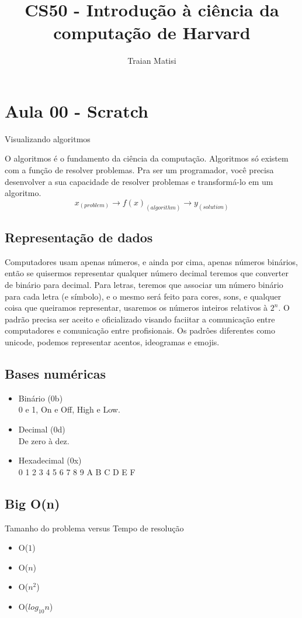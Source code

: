 \documentclass[12pt,a4paper]{article} %
\author{Traian Matisi}
\title{CS50 - Introdução à ciência da computação de Harvard}
\begin{document}
\maketitle

\section{Aula 00 - Scratch}
Visualizando algoritmos

O algoritmos é o fundamento da ciência da computação. Algoritmos só existem com a função de resolver problemas. Pra ser um programador, você precisa desenvolver a sua capacidade de resolver problemas e transformá-lo em um algoritmo. $$x_{(problem)}\rightarrow f(x)_{(algorithm)}\rightarrow y_{(solution)}$$

\subsection{Representação de dados}
Computadores usam apenas números, e ainda por cima, apenas números binários, então se quisermos representar qualquer número decimal teremos que converter de binário para decimal. Para letras, teremos que associar um número binário para cada letra (e símbolo), e o mesmo será feito para cores, sons, e qualquer coisa que queiramos representar, usaremos os números inteiros relativos à $2^n$. O padrão precisa ser aceito e oficializado visando faciitar a comunicação entre computadores e comunicação entre profisionais. Os padrôes diferentes como unicode, podemos representar acentos, ideogramas e emojis.

\subsection{Bases numéricas}
\begin{itemize}
\item Binário (0b)\\ 0 e 1, On e Off, High e Low. 
\item Decimal (0d)\\ De zero à dez.
\item Hexadecimal (0x)\\0 1 2 3 4 5 6 7 8 9 A B C D E F
\end{itemize}

\subsection{Big O(n)}
Tamanho do problema versus Tempo de resolução
\begin{itemize}
\item O($1$)
\item O($n$)
\item O($n^2$)
\item O($log_{10}n$)
\end{itemize}
\end{document}
